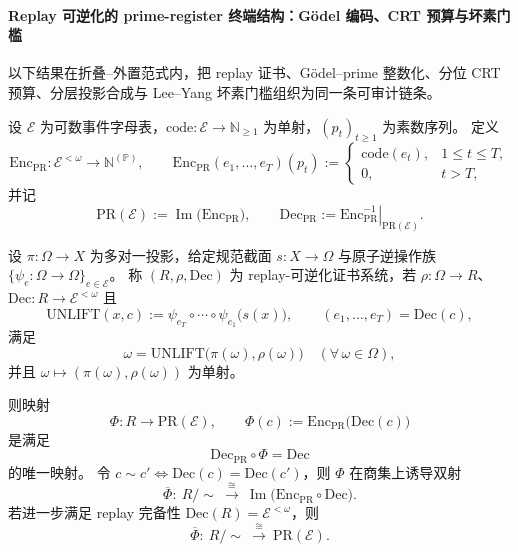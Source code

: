 \paragraph{Replay 可逆化的 prime-register 终端结构：Gödel 编码、CRT 预算与坏素门槛}
以下结果在折叠--外置范式内，把 replay 证书、Gödel--prime 整数化、分位 CRT 预算、分层投影合成与 Lee--Yang 坏素门槛组织为同一条可审计链条。

\begin{theorem}\label{thm:xi-replay-godel-prime-terminality}
设 \(\mathcal E\) 为可数事件字母表，\(\mathrm{code}:\mathcal E\to\mathbb N_{\ge1}\) 为单射，\((p_t)_{t\ge1}\) 为素数序列。
定义
\[
\mathrm{Enc}_{\mathrm{PR}}:\mathcal E^{<\omega}\to \mathbb N^{(\mathbb P)},
\qquad
\mathrm{Enc}_{\mathrm{PR}}(e_1,\dots,e_T)(p_t):=
\begin{cases}
\mathrm{code}(e_t),&1\le t\le T,\\
0,&t>T,
\end{cases}
\]
并记
\[
\mathrm{PR}(\mathcal E):=\operatorname{Im}\!\bigl(\mathrm{Enc}_{\mathrm{PR}}\bigr),
\qquad
\mathrm{Dec}_{\mathrm{PR}}:=\left.\mathrm{Enc}_{\mathrm{PR}}^{-1}\right|_{\mathrm{PR}(\mathcal E)}.
\]

设 \(\pi:\Omega\to X\) 为多对一投影，给定规范截面 \(s:X\to\Omega\) 与原子逆操作族 \(\{\psi_e:\Omega\to\Omega\}_{e\in\mathcal E}\)。
称 \((R,\rho,\mathrm{Dec})\) 为 replay-可逆化证书系统，若 \(\rho:\Omega\to R\)、\(\mathrm{Dec}:R\to\mathcal E^{<\omega}\) 且
\[
\mathrm{UNLIFT}(x,c):=\psi_{e_T}\circ\cdots\circ\psi_{e_1}\bigl(s(x)\bigr),
\qquad
(e_1,\dots,e_T)=\mathrm{Dec}(c),
\]
满足
\[
\omega=\mathrm{UNLIFT}\bigl(\pi(\omega),\rho(\omega)\bigr)
\quad(\forall\,\omega\in\Omega),
\]
并且 \(\omega\mapsto(\pi(\omega),\rho(\omega))\) 为单射。

则映射
\[
\Phi:R\to \mathrm{PR}(\mathcal E),
\qquad
\Phi(c):=\mathrm{Enc}_{\mathrm{PR}}\bigl(\mathrm{Dec}(c)\bigr)
\]
是满足
\[
\mathrm{Dec}_{\mathrm{PR}}\circ\Phi=\mathrm{Dec}
\]
的唯一映射。
令 \(c\sim c'\iff \mathrm{Dec}(c)=\mathrm{Dec}(c')\)，则 \(\Phi\) 在商集上诱导双射
\[
\overline\Phi:\ R/{\sim}\ \xrightarrow{\ \cong\ }\ \operatorname{Im}\!\bigl(\mathrm{Enc}_{\mathrm{PR}}\circ\mathrm{Dec}\bigr).
\]
若进一步满足 replay 完备性 \(\mathrm{Dec}(R)=\mathcal E^{<\omega}\)，则
\[
\overline\Phi:\ R/{\sim}\ \xrightarrow{\ \cong\ }\ \mathrm{PR}(\mathcal E).
\]
\end{theorem}

